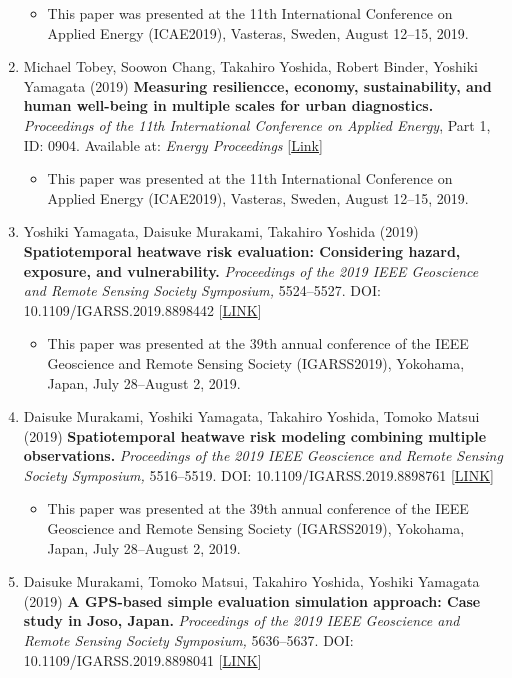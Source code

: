 \documentclass[]{book}
\providecommand{\tightlist}{%
  \setlength{\itemsep}{0pt}\setlength{\parskip}{0pt}}
\begin{document}
\begin{enumerate}
  \begin{itemize}
  \tightlist
  \item
    This paper was presented at the 11th International Conference on Applied Energy (ICAE2019), Vasteras, Sweden, August 12--15, 2019.
  \end{itemize}
\item
  Michael Tobey, Soowon Chang, Takahiro Yoshida, Robert Binder, Yoshiki Yamagata (2019)
  \textbf{Measuring resiliencce, economy, sustainability, and human well-being in multiple scales for urban diagnostics.}
  \emph{Proceedings of the 11th International Conference on Applied Energy}, Part 1, ID: 0904.
  Available at: \emph{Energy Proceedings} {[}\href{https://www.energy-proceedings.org/measuring-resilience-economy-sustainability-and-human-wellbeing-in-multiple-scales-for-urban-diagnostics/}{Link}{]}

  \begin{itemize}
  \tightlist
  \item
    This paper was presented at the 11th International Conference on Applied Energy (ICAE2019), Vasteras, Sweden, August 12--15, 2019.
  \end{itemize}
\item
  Yoshiki Yamagata, Daisuke Murakami, Takahiro Yoshida (2019)
  \textbf{Spatiotemporal heatwave risk evaluation: Considering hazard, exposure, and vulnerability.}
  \emph{Proceedings of the 2019 IEEE Geoscience and Remote Sensing Society Symposium,} 5524--5527.
  DOI: 10.1109/IGARSS.2019.8898442 {[}\href{https://ieeexplore.ieee.org/document/8898442}{LINK}{]}

  \begin{itemize}
  \tightlist
  \item
    This paper was presented at the 39th annual conference of the IEEE Geoscience and Remote Sensing Society (IGARSS2019), Yokohama, Japan, July 28--August 2, 2019.
  \end{itemize}
\item
  Daisuke Murakami, Yoshiki Yamagata, Takahiro Yoshida, Tomoko Matsui (2019)
  \textbf{Spatiotemporal heatwave risk modeling combining multiple observations.}
  \emph{Proceedings of the 2019 IEEE Geoscience and Remote Sensing Society Symposium,} 5516--5519.
  DOI: 10.1109/IGARSS.2019.8898761 {[}\href{https://ieeexplore.ieee.org/document/8898761}{LINK}{]}

  \begin{itemize}
  \tightlist
  \item
    This paper was presented at the 39th annual conference of the IEEE Geoscience and Remote Sensing Society (IGARSS2019), Yokohama, Japan, July 28--August 2, 2019.
  \end{itemize}
\item
  Daisuke Murakami, Tomoko Matsui, Takahiro Yoshida, Yoshiki Yamagata (2019)
  \textbf{A GPS-based simple evaluation simulation approach: Case study in Joso, Japan.}
  \emph{Proceedings of the 2019 IEEE Geoscience and Remote Sensing Society Symposium,} 5636--5637.
  DOI: 10.1109/IGARSS.2019.8898041 {[}\href{https://ieeexplore.ieee.org/document/8898041}{LINK}{]}


\end{enumerate}
\end{document}
